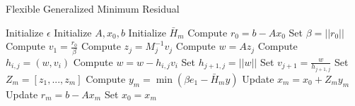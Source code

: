 \begin{algorithm}
    \caption{Flexible Generalized Minimum Residual}
    \begin{algorithmic}[1]
        \State Initialize $\epsilon$ 
        \State Initialize  $A, x_0, b$
        \State Initialize $\bar{H}_m$
            \State Compute $r_0 = b - Ax_0$
            \State Set $\beta = ||r_0||$
            \State Compute $v_1 = \frac{r_0}{\beta}$
             
                \State Compute $z_j = M^{-1}_jv_j$ 
                \State Compute $w = Az_j$
                    \State Compute $h_{i,j} = (w, v_i)$
                    \State Compute $w = w - h_{i,j}v_i$
                \EndFor
                \State Set $h_{j+1,j} = ||w||$
                \State Set $v_{j+1} = \frac{w}{h_{j+1,j}}$
            \EndFor
            \State Set $Z_m = [z_1, ..., z_m]$
            \State Compute $y_m = \min(\beta e_1 - \bar{H}_m y)$ 
            \State Update $x_m = x_0 + Z_my_m$
            \State Update $r_m = b - Ax_m$
            \State Set $x_0 = x_m$
        \EndWhile
    \end{algorithmic}
    \label{alg:fgmres}
    \end{algorithm}
